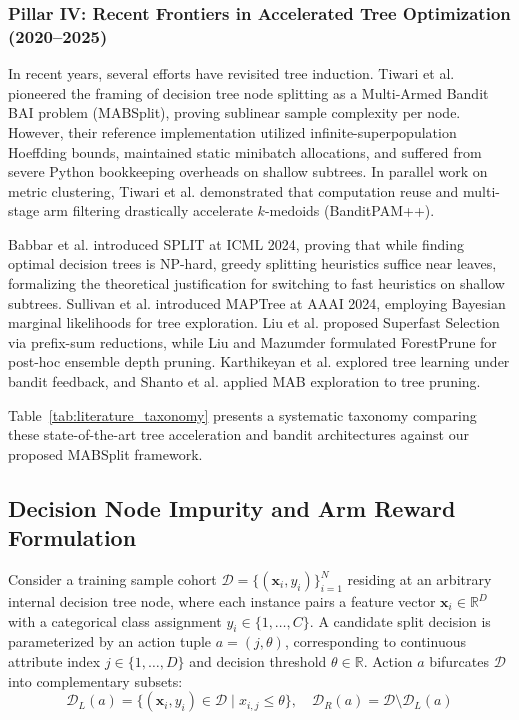 \subsubsection{Pillar IV: Recent Frontiers in Accelerated Tree Optimization (2020--2025)}
In recent years, several efforts have revisited tree induction. Tiwari et al. \cite{tiwari2022mabsplit} pioneered the framing of decision tree node splitting as a Multi-Armed Bandit BAI problem (MABSplit), proving sublinear sample complexity per node. However, their reference implementation utilized infinite-superpopulation Hoeffding bounds, maintained static minibatch allocations, and suffered from severe Python bookkeeping overheads on shallow subtrees. In parallel work on metric clustering, Tiwari et al. \cite{tiwari2023banditpam} demonstrated that computation reuse and multi-stage arm filtering drastically accelerate $k$-medoids (BanditPAM++). 

Babbar et al. \cite{babbar2024near} introduced SPLIT at ICML 2024, proving that while finding optimal decision trees is NP-hard, greedy splitting heuristics suffice near leaves, formalizing the theoretical justification for switching to fast heuristics on shallow subtrees. Sullivan et al. \cite{sullivan2024maptree} introduced MAPTree at AAAI 2024, employing Bayesian marginal likelihoods for tree exploration. Liu et al. \cite{liu2024superfast} proposed Superfast Selection via prefix-sum reductions, while Liu and Mazumder \cite{liu2023forestprune} formulated ForestPrune for post-hoc ensemble depth pruning. Karthikeyan et al. \cite{karthikeyan2023learning} explored tree learning under bandit feedback, and Shanto et al. \cite{shanto2025mab} applied MAB exploration to tree pruning.

Table~\ref{tab:literature_taxonomy} presents a systematic taxonomy comparing these state-of-the-art tree acceleration and bandit architectures against our proposed MABSplit framework.



\subsection{Decision Node Impurity and Arm Reward Formulation}
Consider a training sample cohort $\mathcal{D} = \{(\mathbf{x}_i, y_i)\}_{i=1}^N$ residing at an arbitrary internal decision tree node, where each instance pairs a feature vector $\mathbf{x}_i \in \mathbb{R}^D$ with a categorical class assignment $y_i \in \{1, \dots, C\}$. A candidate split decision is parameterized by an action tuple $a = (j, \theta)$, corresponding to continuous attribute index $j \in \{1, \dots, D\}$ and decision threshold $\theta \in \mathbb{R}$. Action $a$ bifurcates $\mathcal{D}$ into complementary subsets:
\begin{equation}
\mathcal{D}_L(a) = \{(\mathbf{x}_i, y_i) \in \mathcal{D} \mid x_{i, j} \le \theta\}, \quad \mathcal{D}_R(a) = \mathcal{D} \setminus \mathcal{D}_L(a)
\end{equation}

